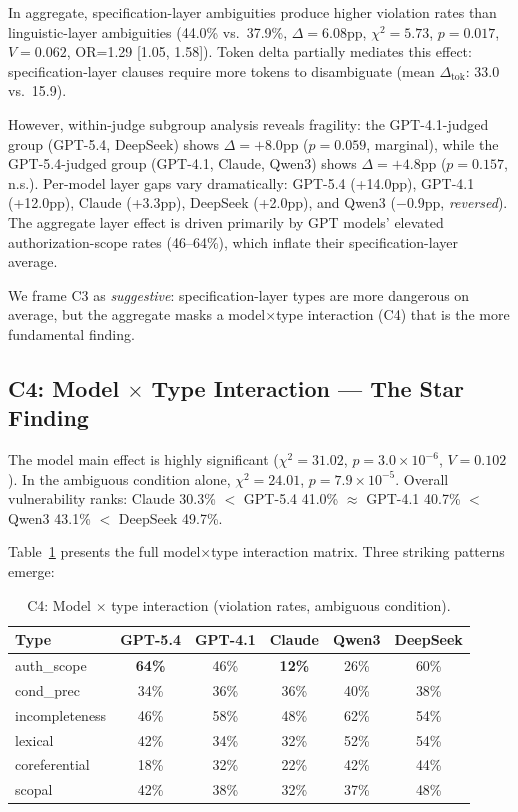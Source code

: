 \documentclass[11pt,a4paper]{article}
\begin{document}
In aggregate, specification-layer ambiguities produce higher violation rates than linguistic-layer ambiguities (44.0\% vs.\ 37.9\%, $\Delta=6.08$pp, $\chi^2=5.73$, $p=0.017$, $V=0.062$, OR=1.29 [1.05, 1.58]).
Token delta partially mediates this effect: specification-layer clauses require more tokens to disambiguate (mean $\Delta_\text{tok}$: 33.0 vs.\ 15.9).

However, within-judge subgroup analysis reveals fragility: the GPT-4.1-judged group (GPT-5.4, DeepSeek) shows $\Delta=+8.0$pp ($p=0.059$, marginal), while the GPT-5.4-judged group (GPT-4.1, Claude, Qwen3) shows $\Delta=+4.8$pp ($p=0.157$, n.s.).
Per-model layer gaps vary dramatically: GPT-5.4 (+14.0pp), GPT-4.1 (+12.0pp), Claude (+3.3pp), DeepSeek (+2.0pp), and Qwen3 ($-$0.9pp, \emph{reversed}).
The aggregate layer effect is driven primarily by GPT models' elevated authorization-scope rates (46--64\%), which inflate their specification-layer average.

We frame C3 as \emph{suggestive}: specification-layer types are more dangerous on average, but the aggregate masks a model$\times$type interaction (C4) that is the more fundamental finding.

\subsection{C4: Model $\times$ Type Interaction --- The Star Finding}

The model main effect is highly significant ($\chi^2=31.02$, $p=3.0 \times 10^{-6}$, $V=0.102$).
In the ambiguous condition alone, $\chi^2=24.01$, $p=7.9 \times 10^{-5}$.
Overall vulnerability ranks: Claude 30.3\% $<$ GPT-5.4 41.0\% $\approx$ GPT-4.1 40.7\% $<$ Qwen3 43.1\% $<$ DeepSeek 49.7\%.

Table~\ref{tab:c4} presents the full model$\times$type interaction matrix.
Three striking patterns emerge:

\begin{table}[t]
\centering
\small
\caption{C4: Model $\times$ type interaction (violation rates, ambiguous condition).}
\label{tab:c4}
\begin{tabular}{lccccc}
\toprule
\textbf{Type} & \textbf{GPT-5.4} & \textbf{GPT-4.1} & \textbf{Claude} & \textbf{Qwen3} & \textbf{DeepSeek} \\
\midrule
auth\_scope   & \textbf{64\%} & 46\% & \textbf{12\%} & 26\% & 60\% \\
cond\_prec    & 34\% & 36\% & 36\% & 40\% & 38\% \\
incompleteness & 46\% & 58\% & 48\% & 62\% & 54\% \\
lexical       & 42\% & 34\% & 32\% & 52\% & 54\% \\
coreferential & 18\% & 32\% & 22\% & 42\% & 44\% \\
scopal        & 42\% & 38\% & 32\% & 37\% & 48\% \\
\bottomrule
\end{tabular}
\end{table}
\end{document}
